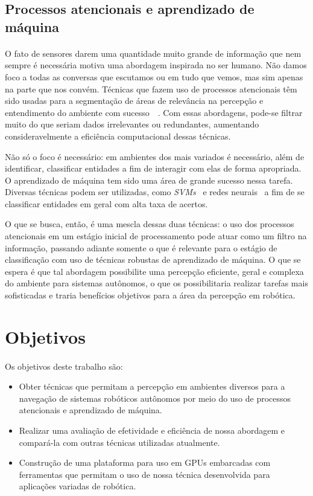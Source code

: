 \documentclass[11pt]{article}
\newcommand{\tit}[1]{\textit{#1}}
\begin{document}
\subsection{Processos atencionais e aprendizado de máquina}
\paragraph{}
O fato de sensores darem uma quantidade muito grande de informação que nem 
sempre é necessária motiva uma abordagem inspirada no ser humano.
Não damos foco a todas as conversas que escutamos ou em tudo que vemos, mas sim 
apenas na parte que nos convém. 
Técnicas que fazem uso de processos atencionais têm sido usadas para a 
segmentação de áreas de relevância na percepção e entendimento do 
ambiente com sucesso~\cite{bio}~\cite{esther}.
Com essas abordagens, pode-se filtrar muito do que seriam dados irrelevantes ou
redundantes, aumentando consideravelmente a eficiência computacional dessas
técnicas.

Não só o foco é necessário: em ambientes dos mais variados é necessário, além
de identificar, classificar entidades a fim de interagir com elas de forma
apropriada. 
O aprendizado de máquina tem sido uma área de grande sucesso nessa tarefa.
Diversas técnicas podem ser utilizadas, como \tit{SVMs}~\cite{svm} 
e redes neurais~\cite{nn} a fim de se classificar entidades em geral com 
alta taxa de acertos. 

O que se busca, então, é uma mescla dessas duas técnicas: o uso dos processos
atencionais em um estágio inicial de processamento pode atuar como um filtro
na informação, passando adiante somente o que é relevante para o estágio de
classificação com uso de técnicas robustas de aprendizado de máquina. 
O que se espera é que tal abordagem possibilite uma percepção eficiente, geral
e complexa do ambiente para sistemas autônomos, o que os possibilitaria 
realizar tarefas mais sofisticadas e traria benefícios objetivos para
a área da percepção em robótica.

\section{Objetivos}
\paragraph{}
Os objetivos deste trabalho são:
\begin{itemize}
	\item Obter técnicas que permitam a percepção em ambientes
		diversos para a navegação de sistemas robóticos autônomos por meio 
		do uso de processos atencionais e aprendizado de máquina.
	\item Realizar uma avaliação de efetividade e eficiência de nossa abordagem
		e compará-la com outras técnicas utilizadas atualmente.
	\item Construção de uma plataforma para uso em GPUs embarcadas com 
		ferramentas que permitam o uso de nossa técnica desenvolvida para
		aplicações variadas de robótica.
\end{itemize}
\end{document}
